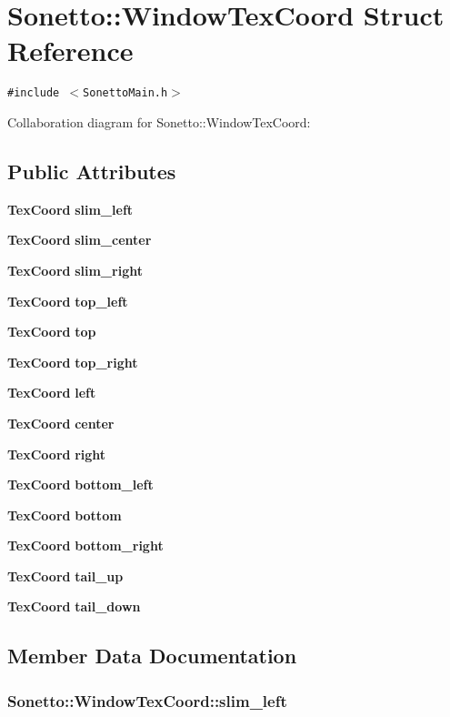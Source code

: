 \section{Sonetto::WindowTexCoord Struct Reference}
\label{struct_sonetto_1_1_window_tex_coord}
{\tt \#include $<$SonettoMain.h$>$}

Collaboration diagram for Sonetto::WindowTexCoord:\subsection*{Public Attributes}
\begin{CompactItemize}
\item 
{\bf TexCoord} {\bf slim\_\-left}
\item 
{\bf TexCoord} {\bf slim\_\-center}
\item 
{\bf TexCoord} {\bf slim\_\-right}
\item 
{\bf TexCoord} {\bf top\_\-left}
\item 
{\bf TexCoord} {\bf top}
\item 
{\bf TexCoord} {\bf top\_\-right}
\item 
{\bf TexCoord} {\bf left}
\item 
{\bf TexCoord} {\bf center}
\item 
{\bf TexCoord} {\bf right}
\item 
{\bf TexCoord} {\bf bottom\_\-left}
\item 
{\bf TexCoord} {\bf bottom}
\item 
{\bf TexCoord} {\bf bottom\_\-right}
\item 
{\bf TexCoord} {\bf tail\_\-up}
\item 
{\bf TexCoord} {\bf tail\_\-down}
\end{CompactItemize}


\subsection{Member Data Documentation}
\subsubsection{ {\bf Sonetto::WindowTexCoord::slim\_\-left}}\label{struct_sonetto_1_1_window_tex_coord_297a028f98b7307d3552cfac533b835e}



